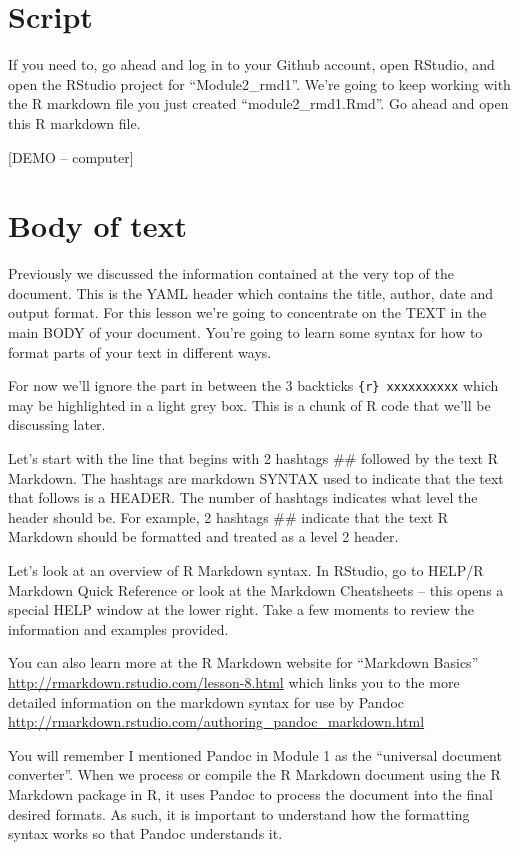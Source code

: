 \documentclass[]{book}
\theoremstyle{definition}
\theoremstyle{definition}
\theoremstyle{definition}
\theoremstyle{remark}
\begin{document}
\section{Script}\label{script}

If you need to, go ahead and log in to your Github account, open
RStudio, and open the RStudio project for ``Module2\_rmd1''. We're going
to keep working with the R markdown file you just created
``module2\_rmd1.Rmd''. Go ahead and open this R markdown file.

{[}DEMO -- computer{]}

\section{Body of text}\label{body-of-text}

Previously we discussed the information contained at the very top of the
document. This is the YAML header which contains the title, author, date
and output format. For this lesson we're going to concentrate on the
TEXT in the main BODY of your document. You're going to learn some
syntax for how to format parts of your text in different ways.

For now we'll ignore the part in between the 3 backticks
\texttt{\{r\}\ xxxxxxxxxx} which may be highlighted in a light grey box.
This is a chunk of R code that we'll be discussing later.

Let's start with the line that begins with 2 hashtags \#\# followed by
the text R Markdown. The hashtags are markdown SYNTAX used to indicate
that the text that follows is a HEADER. The number of hashtags indicates
what level the header should be. For example, 2 hashtags \#\# indicate
that the text R Markdown should be formatted and treated as a level 2
header.

Let's look at an overview of R Markdown syntax. In RStudio, go to HELP/R
Markdown Quick Reference or look at the Markdown Cheatsheets -- this
opens a special HELP window at the lower right. Take a few moments to
review the information and examples provided.

You can also learn more at the R Markdown website for ``Markdown
Basics'' \url{http://rmarkdown.rstudio.com/lesson-8.html} which links
you to the more detailed information on the markdown syntax for use by
Pandoc \url{http://rmarkdown.rstudio.com/authoring_pandoc_markdown.html}

You will remember I mentioned Pandoc in Module 1 as the ``universal
document converter''. When we process or compile the R Markdown document
using the R Markdown package in R, it uses Pandoc to process the
document into the final desired formats. As such, it is important to
understand how the formatting syntax works so that Pandoc understands
it.
\end{document}
